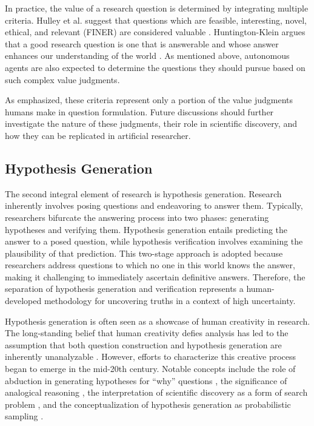 \documentclass{article}
\begin{document}
In practice, the value of a research question is determined by integrating multiple criteria. Hulley et al. suggest that questions which are feasible, interesting, novel, ethical, and relevant (FINER) are considered valuable \cite{hulley2007designing}. Huntington-Klein argues that a good research question is one that is answerable and whose answer enhances our understanding of the world \cite{huntington2021effect}. As mentioned above, autonomous agents are also expected to determine the questions they should pursue based on such complex value judgments.

As emphasized, these criteria represent only a portion of the value judgments humans make in question formulation. Future discussions should further investigate the nature of these judgments, their role in scientific discovery, and how they can be replicated in artificial researcher.

\subsection{Hypothesis Generation}

The second integral element of research is hypothesis generation. Research inherently involves posing questions and endeavoring to answer them. Typically, researchers bifurcate the answering process into two phases: generating hypotheses and verifying them. Hypothesis generation entails predicting the answer to a posed question, while hypothesis verification involves examining the plausibility of that prediction. This two-stage approach is adopted because researchers address questions to which no one in this world knows the answer, making it challenging to immediately ascertain definitive answers. Therefore, the separation of hypothesis generation and verification represents a human-developed methodology for uncovering truths in a context of high uncertainty.

Hypothesis generation is often seen as a showcase of human creativity in research. The long-standing belief that human creativity defies analysis has led to the assumption that both question construction and hypothesis generation are inherently unanalyzable \cite{sep-scientific-discovery}. However, efforts to characterize this creative process began to emerge in the mid-20th century. Notable concepts include the role of abduction in generating hypotheses for ``why'' questions \cite{hanson1965patterns,magnani2011abduction}, the significance of analogical reasoning \cite{gentner2002analogy}, the interpretation of scientific discovery as a form of search problem \cite{langley1987scientific}, and the conceptualization of hypothesis generation as probabilistic sampling \cite{dasgupta2017hypotheses}.
\end{document}
